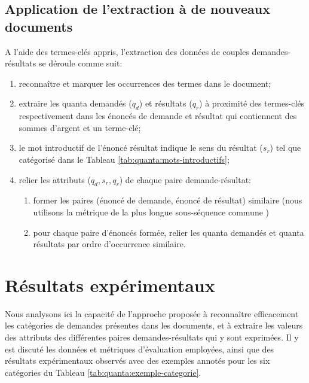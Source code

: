 \subsection{Application de l'extraction à de nouveaux documents}
A l'aide des termes-clés appris, l'extraction des données de couples demandes-résultats se déroule comme suit:
\begin{enumerate}
	\item reconnaître et marquer les occurrences des termes dans le document;
	\item extraire les quanta demandés ($q_d$) et résultats ($q_r$) à proximité des termes-clés respectivement dans les énoncés de demande et résultat qui contiennent des sommes d'argent et un terme-clé;
	\item le mot introductif de l'énoncé résultat indique le sens du résultat ($s_r$) tel que catégorisé dans le Tableau \ref{tab:quanta:mots-introductifs};
	\item relier les attributs ($q_d, s_r, q_r$) de chaque paire demande-résultat:%
	\begin{enumerate}
		\item former les paires (énoncé de demande, énoncé de résultat) similaire (nous utilisons la métrique de \og la plus longue sous-séquence commune \fg{} \citep{bakkelund2009lcs}) 
		\item pour chaque paire d'énoncés formée, relier les quanta demandés et quanta résultats par ordre d'occurrence similaire.
	\end{enumerate}
\end{enumerate}

\section{Résultats expérimentaux}

Nous analysons ici la capacité de l'approche proposée à reconnaître efficacement les catégories de demandes présentes dans les documents, et à extraire les valeurs des attributs des différentes paires demandes-résultats qui y sont exprimées.  Il y est discuté les données et métriques d'évaluation employées, ainsi que des résultats expérimentaux observés avec des exemples annotés pour les six catégories du Tableau \ref{tab:quanta:exemple-categorie}. 


